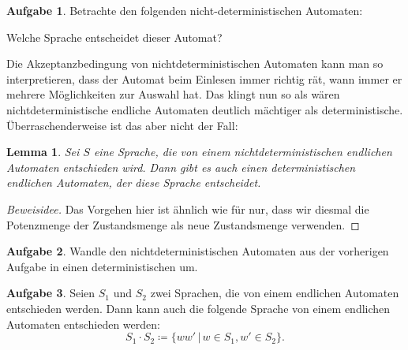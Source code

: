 \documentclass[a4paper,ngerman,12pt]{scrartcl}
\theoremstyle{definition}
\newtheorem{aufg}{Aufgabe}
\theoremstyle{plain}
\newtheorem{lemma}[defn]{Lemma}
\theoremstyle{remark}
\begin{document}
\begin{aufg}
	Betrachte den folgenden nicht-deterministischen Automaten:
	\begin{center}
	\end{center}
	Welche Sprache entscheidet dieser Automat?
\end{aufg}

Die Akzeptanzbedingung von nichtdeterministischen Automaten kann man so interpretieren, dass der Automat beim Einlesen immer richtig rät, wann immer er mehrere Möglichkeiten zur Auswahl hat. Das klingt nun so als wären nichtdeterministische endliche Automaten deutlich mächtiger als deterministische. Überraschenderweise ist das aber nicht der Fall:

\begin{lemma}
	Sei $S$ eine Sprache, die von einem nichtdeterministischen endlichen Automaten entschieden wird. Dann gibt es auch einen deterministischen endlichen Automaten, der diese Sprache entscheidet.
\end{lemma}

\begin{proof}[Beweisidee]
	Das Vorgehen hier ist ähnlich wie für  nur, dass wir diesmal die Potenzmenge der Zustandsmenge als neue Zustandsmenge verwenden.
\end{proof}

\begin{aufg}
	Wandle den nichtdeterministischen Automaten aus der vorherigen Aufgabe in einen deterministischen um.
\end{aufg}

\begin{aufg}
	Seien $S_1$ und $S_2$ zwei Sprachen, die von einem endlichen Automaten entschieden werden. Dann kann auch die folgende Sprache von einem endlichen Automaten entschieden werden:
		\[S_1\cdot S_2 \coloneqq \{ww' \,|\, w \in S_1, w' \in S_2\}.\]
\end{aufg}
\end{document}
